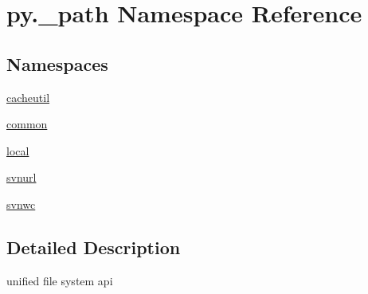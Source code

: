 \hypertarget{namespacepy_1_1__path}{}\section{py.\+\_\+path Namespace Reference}
\label{namespacepy_1_1__path}
\subsection*{Namespaces}
\begin{DoxyCompactItemize}
\item 
 \hyperlink{namespacepy_1_1__path_1_1cacheutil}{cacheutil}
\item 
 \hyperlink{namespacepy_1_1__path_1_1common}{common}
\item 
 \hyperlink{namespacepy_1_1__path_1_1local}{local}
\item 
 \hyperlink{namespacepy_1_1__path_1_1svnurl}{svnurl}
\item 
 \hyperlink{namespacepy_1_1__path_1_1svnwc}{svnwc}
\end{DoxyCompactItemize}


\subsection{Detailed Description}
\begin{DoxyVerb}unified file system api \end{DoxyVerb}
 